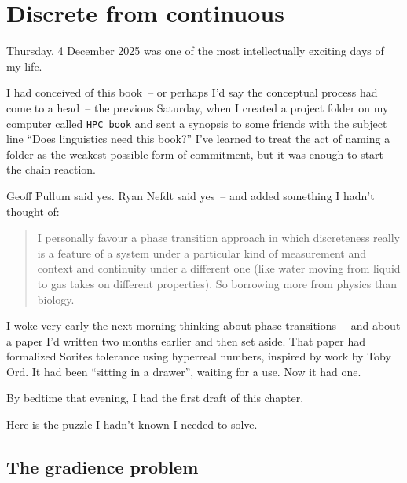 
\chapter{Discrete from continuous}
\label{ch:dynamic-discreteness}


Thursday, 4 December 2025 was one of the most intellectually exciting days of my life.

I had conceived of this book~-- or perhaps I'd say the conceptual process had come to a head~-- the previous Saturday, when I created a project folder on my computer called \texttt{HPC book} and sent a synopsis to some friends with the subject line \enquote{Does linguistics need this book?} I've learned to treat the act of naming a folder as the weakest possible form of commitment, but it was enough to start the chain reaction.

Geoff Pullum said yes. Ryan Nefdt said yes~-- and added something I hadn't thought of:

\begin{quote}
I personally favour a phase transition approach in which discreteness really is a feature of a system under a particular kind of measurement and context and continuity under a different one (like water moving from liquid to gas takes on different properties). So borrowing more from physics than biology.
\end{quote}

I woke very early the next morning thinking about phase transitions~-- and about a paper I'd written two months earlier and then set aside. That paper had formalized Sorites tolerance using hyperreal numbers, inspired by work by Toby Ord. It had been \enquote{sitting in a drawer}, waiting for a use. Now it had one.

By bedtime that evening, I had the first draft of this chapter.

Here is the puzzle I hadn't known I needed to solve.

\section{The gradience problem}
\label{sec:5:gradience-problem}

